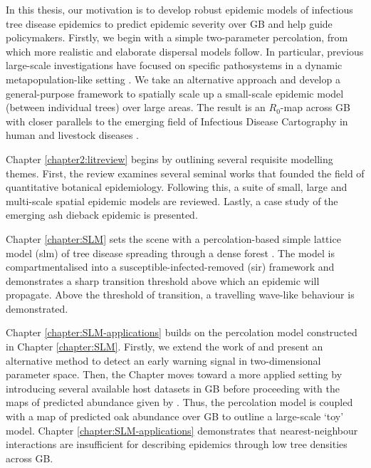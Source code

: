 In this thesis, our motivation is to develop robust epidemic models of infectious tree disease epidemics to predict epidemic severity over GB and help guide policymakers. Firstly, we begin with a simple two-parameter percolation, from which more realistic and elaborate dispersal models follow. 
In particular, previous large-scale investigations have focused on specific pathosystems in a dynamic metapopulation-like setting
\cite{large-scale-control, meentemeyer2011epidemiological, harwood2009epidemiological}. We take an alternative approach and develop a general-purpose framework to spatially scale up a small-scale epidemic model (between individual trees) over large areas. The result is an $R_0$-map across GB with closer parallels to the emerging field of Infectious Disease Cartography in human and livestock diseases \cite{otieno2021modeling, KRAEMER201619, messina2016mapping}.

Chapter \ref{chapter2:litreview} begins by outlining several requisite modelling themes. First, the review examines
several seminal works that founded the field of quantitative botanical epidemiology. Following this,
a suite of small, large and multi-scale spatial epidemic models are reviewed. Lastly, a case study of the emerging
ash dieback epidemic is presented.

Chapter \ref{chapter:SLM} sets the scene with a percolation-based simple lattice model (\acrshort{slm}) of tree
disease spreading through a dense forest \cite{OROZCOFUENTES201912}. The model is compartmentalised
into a susceptible-infected-removed (\acrshort{sir}) framework and demonstrates a sharp transition threshold above which an epidemic will propagate. 
Above the threshold of transition, a travelling wave-like behaviour is demonstrated.

Chapter \ref{chapter:SLM-applications} builds on the percolation model constructed in Chapter \ref{chapter:SLM}.
Firstly, we extend the work of \cite{OROZCOFUENTES201912} and present an alternative method to detect an early warning signal in two-dimensional parameter space. Then, the Chapter moves toward a more applied setting by introducing several available host datasets in GB before proceeding with the maps of predicted abundance given by \cite{hill.data}. Thus, the percolation model is coupled with a map of predicted
oak abundance over GB to outline a large-scale `toy' model. Chapter \ref{chapter:SLM-applications} demonstrates that nearest-neighbour interactions are insufficient for describing epidemics through low tree densities across GB.

